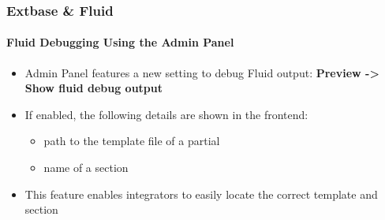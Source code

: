 \begin{frame}[fragile]
	\frametitle{Extbase \& Fluid}
	\framesubtitle{Fluid Debugging Using the Admin Panel}

	\begin{itemize}
		\item Admin Panel features a new setting to debug Fluid output:\newline
			\textbf{Preview -> Show fluid debug output}

		\item If enabled, the following details are shown in the frontend:

			\begin{itemize}
				\item path to the template file of a partial
				\item name of a section
			\end{itemize}

		\item This feature enables integrators to easily locate the correct template and section

	\end{itemize}

\end{frame}

